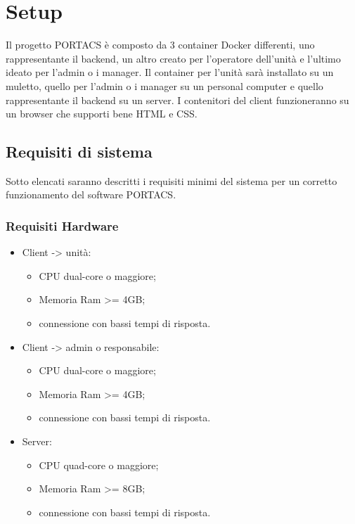 \section{Setup}
Il progetto PORTACS è composto da 3 container Docker differenti, uno rappresentante il backend, un altro creato per l'operatore dell'unità e l'ultimo ideato per l'admin o i manager. Il container per l'unità sarà installato su un muletto, quello per l'admin o i manager su un personal computer e quello rappresentante il backend su un server. I contenitori del client funzioneranno su un browser che supporti bene HTML e CSS.


\subsection{Requisiti di sistema}
Sotto elencati saranno descritti i requisiti minimi del sistema per un corretto funzionamento del software PORTACS.


\subsubsection{Requisiti Hardware}
\begin{itemize}
	\item Client -> unità:
\begin{itemize}
	\item CPU dual-core o maggiore;
	\item Memoria Ram >= 4GB;
	\item connessione con bassi tempi di risposta.
\end{itemize}
	\item Client -> admin o responsabile:
\begin{itemize}
	\item CPU dual-core o maggiore;
	\item Memoria Ram >= 4GB;
	\item connessione con bassi tempi di risposta.
\end{itemize}
	\item Server:
\begin{itemize}
	\item CPU quad-core o maggiore;
	\item Memoria Ram >= 8GB;
	\item connessione con bassi tempi di risposta.
\end{itemize}
\end{itemize}

